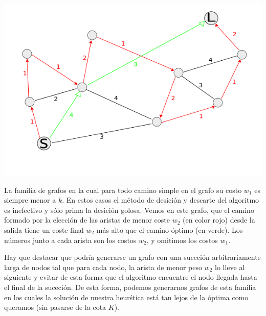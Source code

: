 \begin{center}
\includegraphics[scale=0.7]{img/grafoCaminoMasLargo.png}
\end{center}
\vspace{2mm}

La familia de grafos en la cual para todo camino simple en el grafo su costo $w_1$ es siempre menor a $k$. En estos casos el m\'etodo de desici\'on y descarte del algoritmo es inefectivo y s\'olo prima la desici\'on golosa. Vemos en este grafo, que el camino formado por la elecci\'on de las aristas de menor coste $w_2$ (en color rojo) desde la salida tiene un coste final $w_2$ m\'as alto que el camino \'optimo (en verde). Los n\'umeros junto a cada arista son los costos $w_2$, y omitimos los costos $w_1$.

\vspace{2mm}

Hay que destacar que podr\'ia generarse un grafo con una suceci\'on arbitrariamente larga de nodos tal que para cada nodo, la arista de menor peso $w_2$ lo lleve al siguiente y evitar de esta forma que el algoritmo encuentre el nodo llegada hasta el final de la suceci\'on. De esta forma, podemos generarnos grafos de esta familia en los cuales la soluci\'on de nuestra heur\'stica est\'a tan lejos de la \'optima como queramos (sin pasarse de la cota $K$).


